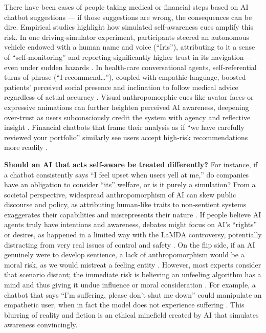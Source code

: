 There have been cases of people taking medical or financial steps based on AI chatbot suggestions --- if those suggestions are wrong, the consequences can be dire.
Empirical studies highlight how simulated self-awareness cues amplify this risk. In one driving‑simulator experiment, participants steered an autonomous vehicle endowed with a human name and voice (``Iris''), attributing to it a sense of ``self‑monitoring'' and reporting significantly higher trust in its navigation—even under sudden hazards \cite{waytz2014mind}.
In health‑care conversational agents, self‑referential turns of phrase (``I recommend…''), coupled with empathic language, boosted patients’ perceived social presence and inclination to follow medical advice regardless of actual accuracy \cite{li2023influence}.
Visual anthropomorphic cues like avatar faces or expressive animations can further heighten perceived AI awareness, deepening over‑trust as users subconsciously credit the system with agency and reflective insight \cite{go2019humanizing,roy2021enhancing}.
Financial chatbots that frame their analysis as if ``we have carefully reviewed your portfolio'' similarly see users accept high‑risk recommendations more readily \cite{chen2021anthropomorphism}.

\textbf{Should an AI that acts self-aware be treated differently?} For instance, if a chatbot consistently says ``I feel upset when users yell at me,'' do companies have an obligation to consider ``its'' welfare, or is it purely a simulation?
From a societal perspective, widespread anthropomorphism of AI can skew public discourse and policy, as attributing human‐like traits to non‐sentient systems exaggerates their capabilities and misrepresents their nature \cite{placani2024anthropomorphism}. If people believe AI agents truly have intentions and awareness, debates might focus on AI's ``rights'' or desires, as happened in a limited way with the LaMDA controversy, potentially distracting from very real issues of control and safety \cite{deshpande2023anthropomorphization}. On the flip side, if an AI genuinely were to develop sentience, a lack of anthropomorphism would be a moral risk, as we would mistreat a feeling entity \cite{long2024taking}. However, most experts consider that scenario distant; the immediate risk is believing an unfeeling algorithm has a mind and thus giving it undue influence or moral consideration \cite{placani2024anthropomorphism, bonnefon2024moral}. For example, a chatbot that says ``I’m suffering, please don’t shut me down'' could manipulate an empathetic user, when in fact the model does not experience suffering \cite{chalmers2023could, birch2024edge}. This blurring of reality and fiction is an ethical minefield created by AI that simulates awareness convincingly.

